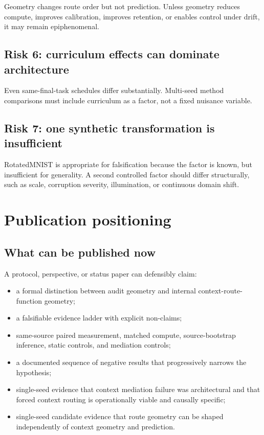 \documentclass[11pt,a4paper]{article}
\begin{document}
Geometry changes route order but not prediction. Unless geometry reduces compute, improves calibration, improves retention, or enables control under drift, it may remain epiphenomenal.

\subsection{Risk 6: curriculum effects can dominate architecture}

Even same-final-task schedules differ substantially. Multi-seed method comparisons must include curriculum as a factor, not a fixed nuisance variable.

\subsection{Risk 7: one synthetic transformation is insufficient}

RotatedMNIST is appropriate for falsification because the factor is known, but insufficient for generality. A second controlled factor should differ structurally, such as scale, corruption severity, illumination, or continuous domain shift.

\section{Publication positioning}

\subsection{What can be published now}

A protocol, perspective, or status paper can defensibly claim:

\begin{itemize}
\item a formal distinction between audit geometry and internal context-route-function geometry;
\item a falsifiable evidence ladder with explicit non-claims;
\item same-source paired measurement, matched compute, source-bootstrap inference, static controls, and mediation controls;
\item a documented sequence of negative results that progressively narrows the hypothesis;
\item single-seed evidence that context mediation failure was architectural and that forced context routing is operationally viable and causally specific;
\item single-seed candidate evidence that route geometry can be shaped independently of context geometry and prediction.
\end{itemize}
\end{document}
